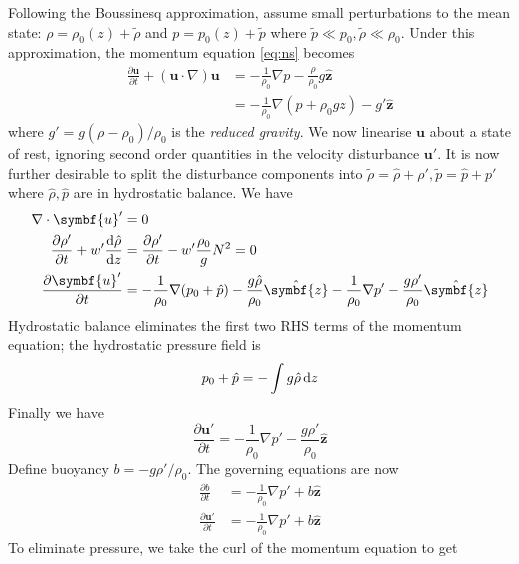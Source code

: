\documentclass{jknotes}
\begin{document}
Following the Boussinesq approximation, assume small perturbations to the mean
state: $\rho = \rho_0(z) + \tilde{\rho}$ and $p = p_0(z) + \tilde{p}$ where
$\tilde{p} \ll p_0, \tilde{\rho} \ll \rho_0$. Under this approximation, the
momentum equation \eqref{eq:ns} becomes
\begin{align}
	\frac{\partial \symbf{u}}{\partial t} + (\symbf{u}\cdot\nabla)\symbf{u} 
	&= - \frac{1}{\rho_0}\nabla p - \frac{\rho}{\rho_0} g \hat{\symbf{z}} \\ 
	&= - \frac{1}{\rho_0} \nabla(p + \rho_0 g z) - g' \hat{\symbf{z}}
\end{align}
where $g' = g(\rho-\rho_0)/\rho_0$ is the \emph{reduced gravity}. We now
linearise $\symbf{u}$ about a state of rest, ignoring second order quantities
in the velocity disturbance $\symbf{u}'$. It is now further desirable to split
the disturbance components into $\tilde{\rho} = \hat{\rho} + \rho', \tilde{p}
= \hat{p} + p'$ where $\hat{\rho}, \hat{p}$ are in hydrostatic balance. We
have
\begin{align}
	\nabla \cdot \symbf{u}' &= 0  \\
	\frac{\partial \rho'}{\partial t} + w' \frac{\diffd \hat{\rho}}{\diffd z}
							&= \frac{\partial \rho'}{\partial t} - w' \frac{\rho_0}{g}N^2 
							= 0 \\
	\frac{\partial \symbf{u}'}{\partial t} 
							&= -\frac{1}{\rho_0}\nabla (p_0+\hat{p}) -
							\frac{g\hat{\rho}}{\rho_0}\hat{\symbf{z}} -
							\frac{1}{\rho_0} \nabla p' -
							\frac{g\rho'}{\rho_0}\hat{\symbf{z}}
							\label{eq:idk} 
\end{align}
Hydrostatic balance eliminates the first two RHS terms of the momentum
equation; the
hydrostatic pressure field is 
\begin{equation}
	p_0 + \hat{p} = -\int g \hat{\rho} \, \diffd z
\end{equation}
Finally we have
\begin{equation}
	\frac{\partial \symbf{u}'}{\partial t} = -\frac{1}{\rho_0} \nabla p' -
	\frac{g\rho'}{\rho_0} \hat{\symbf{z}}
\end{equation}
Define buoyancy $b = - g \rho'/\rho_0$. The governing equations are now
\begin{align}
	\frac{\partial b}{\partial t} &= -\frac{1}{\rho_0} \nabla p' + b
	\hat{\symbf{z}} \\
	\frac{\partial \symbf{u}'}{\partial t} &= -\frac{1}{\rho_0} \nabla p' + b
	\hat{\symbf{z}}
\end{align}
To eliminate pressure, we take the curl of the momentum equation to get
\end{document}

